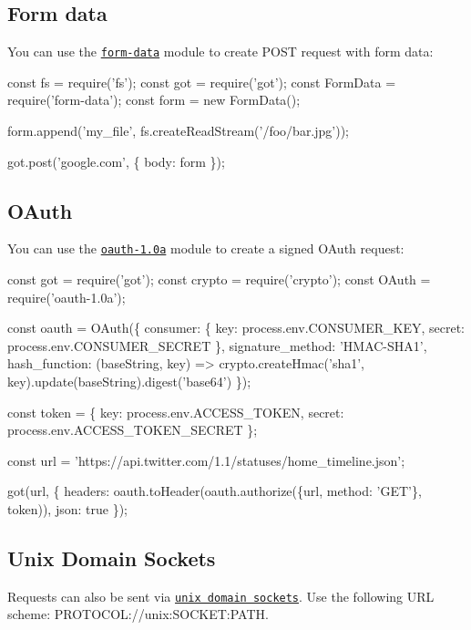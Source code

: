 \subsection*{Form data}

You can use the \href{https://github.com/form-data/form-data}{\tt {\ttfamily form-\/data}} module to create P\+O\+ST request with form data\+:


\begin{DoxyCode}
const fs = require('fs');
const got = require('got');
const FormData = require('form-data');
const form = new FormData();

form.append('my\_file', fs.createReadStream('/foo/bar.jpg'));

got.post('google.com', \{
  body: form
\});
\end{DoxyCode}


\subsection*{O\+Auth}

You can use the \href{https://github.com/ddo/oauth-1.0a}{\tt {\ttfamily oauth-\/1.\+0a}} module to create a signed O\+Auth request\+:


\begin{DoxyCode}
const got = require('got');
const crypto  = require('crypto');
const OAuth = require('oauth-1.0a');

const oauth = OAuth(\{
  consumer: \{
    key: process.env.CONSUMER\_KEY,
    secret: process.env.CONSUMER\_SECRET
  \},
  signature\_method: 'HMAC-SHA1',
  hash\_function: (baseString, key) => crypto.createHmac('sha1', key).update(baseString).digest('base64')
\});

const token = \{
  key: process.env.ACCESS\_TOKEN,
  secret: process.env.ACCESS\_TOKEN\_SECRET
\};

const url = 'https://api.twitter.com/1.1/statuses/home\_timeline.json';

got(url, \{
  headers: oauth.toHeader(oauth.authorize(\{url, method: 'GET'\}, token)),
  json: true
\});
\end{DoxyCode}


\subsection*{Unix Domain Sockets}

Requests can also be sent via \href{http://serverfault.com/questions/124517/whats-the-difference-between-unix-socket-and-tcp-ip-socket}{\tt unix domain sockets}. Use the following U\+RL scheme\+: {\ttfamily P\+R\+O\+T\+O\+C\+OL\+://unix\+:S\+O\+C\+K\+ET\+:P\+A\+TH}.



